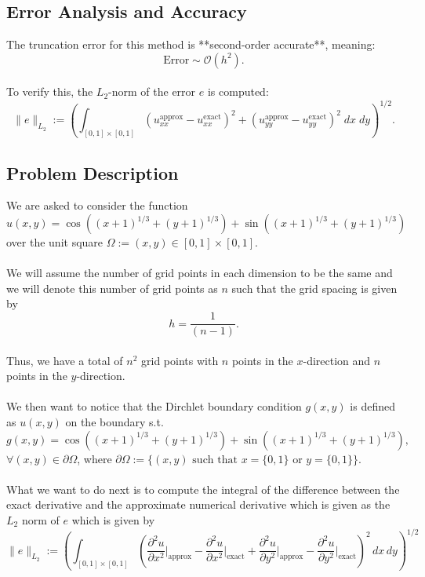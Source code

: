 \documentclass[12pt]{article}
\begin{document}
\subsection{Error Analysis and Accuracy}
The truncation error for this method is **second-order accurate**, meaning:
\[
    \text{Error} \sim \mathcal{O}(h^2).
\]
\\
\noindent To verify this, the \( L_2 \)-norm of the error \( e \) is computed:
\[
\lVert e \rVert_{L_2}  := \left( \int_{[0,1] \times [0,1]} (u_{xx}^{\text{approx}} - u_{xx}^{\text{exact}})^2 + (u_{yy}^{\text{approx}} - u_{yy}^{\text{exact}})^2 \; dx \; dy \right)^{1/2}.
\]



\subsection{Problem Description}
We are asked to consider the function
\[
u(x,y) = \cos((x+1)^{1/3}+(y+1)^{1/3})+\sin((x+1)^{1/3}+(y+1)^{1/3})
\]
\noindent over the unit square $\Omega := (x,y) \in [0,1] \times [0,1]$.
\\
\\
We will assume the number of grid points in each dimension to be the same and we will denote this number of grid points as $n$ such that the grid spacing is given by
\[
h = \frac{1}{(n-1)}.
\]
\\
\noindent Thus, we have a total of $n^2$ grid points with $n$ points in the $x$-direction and $n$ points in the $y$-direction.
\\
\\
We then want to notice that the Dirchlet boundary condition $g(x,y)$ is defined as $u(x,y)$ on the boundary s.t.
\[
g(x,y) = \cos((x+1)^{1/3}+(y+1)^{1/3})+\sin((x+1)^{1/3}+(y+1)^{1/3}),
\]
\noindent $\forall (x,y) \in \partial \Omega$, where $\partial \Omega := \{(x,y) \text{ such that }  x = \{0,1\} \text{ or } y = \{0,1\}\}$.
\\
\\
\noindent What we want to do next is to compute the integral of the difference between the exact derivative and the approximate numerical derivative which is given as the $L_2$ norm of $e$ which is given by
\[
\lVert e \rVert_{L_2}  := \left( \int_{[0,1] \times [0,1]} \left( \frac{\partial^2 u}{\partial x^2} \bigg|_{\text{approx}} - \frac{\partial^2 u}{\partial x^2} \bigg|_{\text{exact}} 
+ \frac{\partial^2 u}{\partial y^2} \bigg|_{\text{approx}} - \frac{\partial^2 u}{\partial y^2} \bigg|_{\text{exact}} \right)^2 \, dx \, dy \right)^{1/2}
\]  
\end{document}
